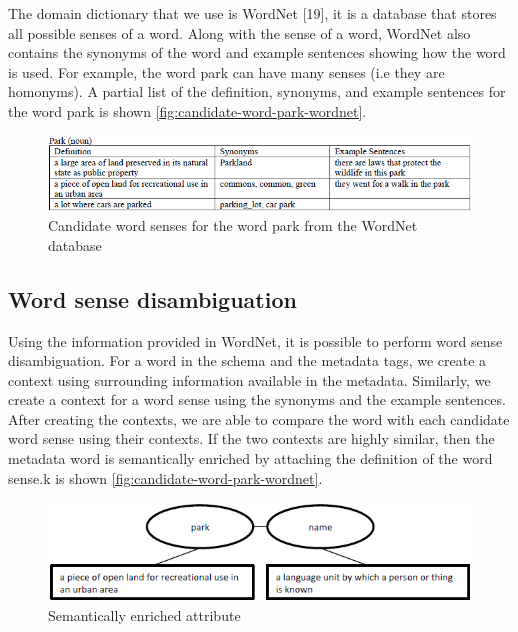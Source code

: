 The domain dictionary that we use is WordNet \cite{Fellbaum1998Computers}[19], it is a database that stores all possible senses of a word. Along with the sense of a word, WordNet also contains the synonyms of the word and example sentences showing how the word is used. For example, the word park can have many senses (i.e they are homonyms). A partial list of the definition, synonyms, and example sentences for the word park is shown \autoref{fig:candidate-word-park-wordnet}.

\begin{figure}
    \centering
    \includegraphics[width=5in]{figures/candidate-word-park-wordnet.png}
    \caption{Candidate word senses for the word park from the WordNet database}
    \label{fig:candidate-word-park-wordnet}
\end{figure}

\subsection{Word sense disambiguation}

Using the information provided in WordNet, it is possible to perform word sense disambiguation. For a word in the schema and the metadata tags, we create a context using surrounding information available in the metadata. Similarly, we create a context for a word sense using the synonyms and the example sentences. After creating the contexts, we are able to compare the word with each candidate word sense using their contexts. If the two contexts are highly similar, then the metadata word is semantically enriched by attaching the definition of the word sense.k is shown \autoref{fig:candidate-word-park-wordnet}.

\begin{figure}
    \centering
    \includegraphics[width=5in]{figures/semantically-enriched-attribute.png}
    \caption{Semantically enriched attribute}
    \label{fig:semantically-enriched-attribute}
\end{figure}

